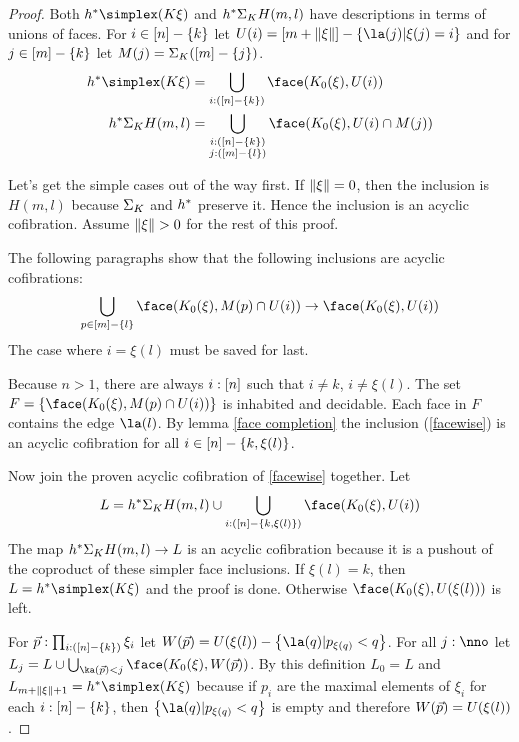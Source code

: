 \documentclass[csh.tex]{subfiles}
\begin{document}
\begin{proof} 
Both $h\ri\simplex(K\xi)$ and $h^* \Sigma_ K H(m,l)$ have descriptions in terms of unions of faces. For $i\in [n]-\left\{k\right\}$ let $\U(i) = [m+\norm\xi]-\set{\la(j)|\xi(j)=i}$ and for $j\in [m]-\left\{k\right\}$ let $M(j) = \Sigma_ K([m]-\left\{j\right\})$.
\begin{align*}
h\ri\simplex(K\xi) &= \bigcup_{i\of([n]-\set{k})} \face(K_0(\xi),\U(i))\\
h\ri \depsum K H(m,l)&= \bigcup_{\substack{i\of([n]-\set{k})\\j\of([m]-\set l)}} \face(K_0(\xi),\U(i)\cap \A(j))
\end{align*}

Let's get the simple cases out of the way first. If $\Vert \xi \Vert = 0$, then the inclusion is $H(m,l)$ because $\Sigma_ K$ and $h^*$ preserve it. Hence the inclusion is an acyclic cofibration. Assume $\Vert \xi \Vert>0$ for the rest of this proof.

The following paragraphs show that the following inclusions are acyclic cofibrations:
\begin{equation} \bigcup_{p\in[m]-\set l} \face(K_0(\xi),\A(p)\cap\U(i))\to \face(K_0(\xi),\U(i)) \label{facewise} \end{equation}
The case where $i=\xi(l)$ must be saved for last.

Because $n>1$, there are always $i:[n]$ such that $i\neq k$, $i\neq \xi(l)$. The set $F = \set{\face(K_0(\xi),\A(p)\cap\U(i))}$ is inhabited and decidable. Each face in $F$ contains the edge $\la(l)$. By lemma \ref{face completion} the inclusion (\ref{facewise}) is an acyclic cofibration for all $i\in [n]-\left\{k,\xi(l)\right\}$.

Now join the proven acyclic cofibration of \ref{facewise} together. Let
\[ L=h\ri \depsum K H(m,l)\cup\bigcup_{i\of([n]-\set{k,\xi(l)})}\face(K_0(\xi),\U(i)) \]
The map $h^* \Sigma_ K H(m,l)\to L$ is an acyclic cofibration because it is a pushout of the coproduct of these simpler face inclusions. If $\xi(l)=k$, then $L=h\ri \simplex(K\xi)$ and the proof is done. Otherwise $\face(K_0(\xi),\U(\xi(l)))$ is left.

For $\vec p :\prod_{i:([n]-\left\{k\right\})}\xi_i$ let $\W(\vec p) = \U(\xi(l))-\set{ \la(q) | p_{\xi(q)} < q }$. For all $j\of\nno$ let $L_j = L\cup \bigcup_{ \ka(\vec p) < j } \face(K_0(\xi),\W(\vec p))$. By this definition $L_0=L$ and $L_{m+\norm\xi+1} = h\ri\simplex(K\xi)$ because if $p_i$ are the maximal elements of $\xi_i$ for each $i:[n]-\left\{k\right\}$, then $\set{ \la(q) | p_{\xi(q)} < q }$ is empty and therefore $W(\vec p) = U(\xi(l))$.


\end{proof}
\end{document}
